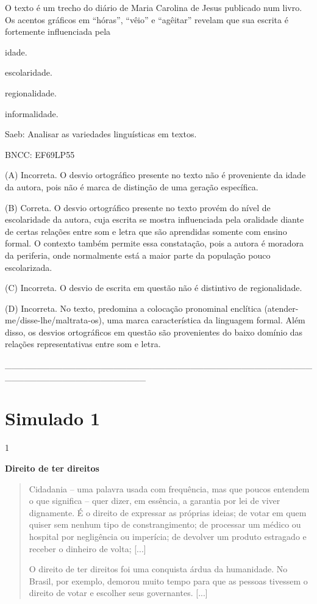 O texto é um trecho do diário de Maria Carolina de Jesus publicado num
livro. Os acentos gráficos em ``hóras'', ``vêio'' e ``agêitar'' revelam
que sua escrita é fortemente influenciada pela

\begin{escolha}
\item idade.

\item escolaridade.

\item regionalidade.

\item informalidade.
\end{escolha}

Saeb: Analisar as variedades linguísticas em textos.

BNCC: EF69LP55

(A) Incorreta. O desvio ortográfico presente no texto não é proveniente
da idade da autora, pois não é marca de distinção de uma geração
específica.

(B) Correta. O desvio ortográfico presente no texto provém do nível de
escolaridade da autora, cuja escrita se mostra influenciada pela
oralidade diante de certas relações entre som e letra que são aprendidas
somente com ensino formal. O contexto também permite essa constatação,
pois a autora é moradora da periferia, onde normalmente está a maior
parte da população pouco escolarizada.

(C) Incorreta. O desvio de escrita em questão não é distintivo de
regionalidade.

(D) Incorreta. No texto, predomina a colocação pronominal enclítica
(atender-me/disse-lhe/maltrata-os), uma marca característica da
linguagem formal. Além disso, os desvios ortográficos em questão são
provenientes do baixo domínio das relações representativas entre som e
letra.

{\_\_\_\_\_\_\_\_\_\_\_\_\_\_\_\_\_\_\_\_\_\_\_\_\_\_\_\_\_\_\_\_\_\_\_\_\_\_\_\_\_\_\_\_\_\_\_\_\_\_\_\_\_\_\_\_\_\_\_\_\_\_\_\_\_\_\_\_\_\_}

\section{Simulado 1}

\num{1}

\textbf{Direito de ter direitos}

\begin{quote}
Cidadania -- uma palavra usada com frequência, mas que poucos entendem o
que significa -- quer dizer, em essência, a garantia por lei de viver
dignamente. É o direito de expressar as próprias ideias; de votar em
quem quiser sem nenhum tipo de constrangimento; de processar um médico
ou hospital por negligência ou imperícia; de devolver um produto
estragado e receber o dinheiro de volta; {[}...{]}

O direito de ter direitos foi uma conquista árdua da humanidade. No
Brasil, por exemplo, demorou muito tempo para que as pessoas tivessem o
direito de votar e escolher seus governantes. {[}...{]}
\end{quote}


